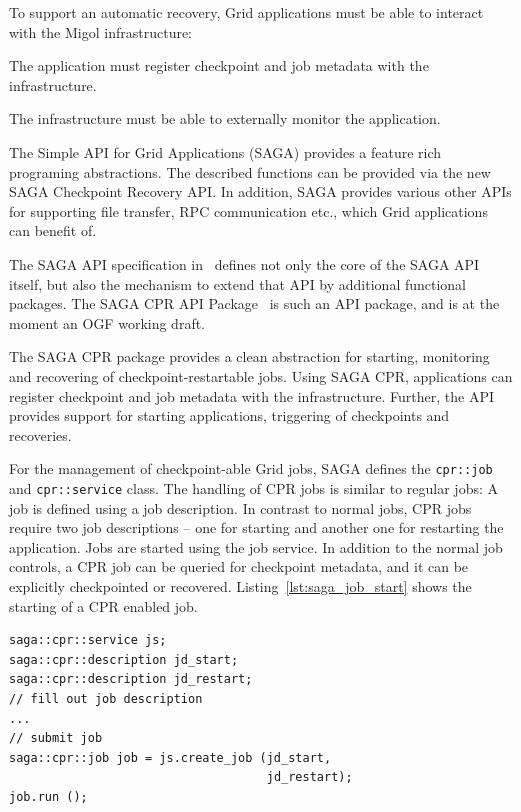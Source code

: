 \documentclass[times, 10pt,twocolumn]{article}
\begin{document}
To support an automatic recovery, Grid applications must be able to interact with the Migol infrastructure:
\begin{compactitem}
    \item The application must register checkpoint and job metadata with the infrastructure.
    \item The infrastructure must be able to externally monitor the application.
\end{compactitem}  
The Simple API for Grid Applications (SAGA) provides a feature rich programing abstractions. The described functions 
can be  provided via the new SAGA Checkpoint Recovery API. In addition, SAGA provides  
various other APIs for supporting file transfer, RPC communication etc., which Grid applications can benefit of.



The SAGA API specification in~\cite{saga_gfd90} defines not only the
core of the SAGA API itself, but also the mechanism to extend that API
by additional functional packages.  The SAGA CPR API
Package~\cite{saga_cpr_draft} is such an API package, and is at the
moment an OGF working draft.

The SAGA CPR package provides a clean abstraction for starting,
monitoring and recovering of checkpoint-restartable jobs.
Using SAGA CPR, applications can register checkpoint and job metadata with the infrastructure. 
Further, the API provides support for starting applications, triggering of checkpoints and recoveries.

For the management of checkpoint-able Grid jobs, SAGA defines the \texttt{cpr::job} and \texttt{cpr::service} class. The handling of 
CPR jobs is similar to regular jobs: A job is defined using a job description. In contrast to normal jobs, 
CPR jobs require  two job descriptions -- one for starting and another one for restarting the application.
Jobs are started using the job service. In addition to the normal job controls, a CPR job can be queried for checkpoint metadata, and 
it can be explicitly checkpointed or recovered. Listing~\ref{lst:saga_job_start} shows the starting of a CPR enabled job.

\begin{lstlisting}[style=myListing, caption={SAGA CPR: Starting a Job}, float=t, label={lst:saga_job_start}]
saga::cpr::service js; 
saga::cpr::description jd_start;
saga::cpr::description jd_restart;
// fill out job description
...
// submit job  
saga::cpr::job job = js.create_job (jd_start, 
                                    jd_restart);
job.run ();
\end{lstlisting}
\end{document}
